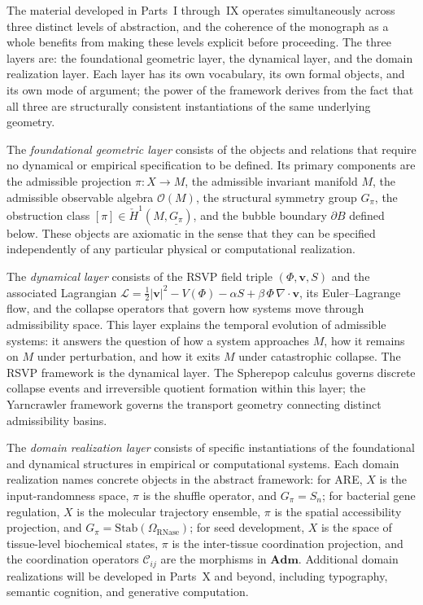 \documentclass[12pt, a4paper]{article}
\theoremstyle{essaystyle}
\begin{document}
The material developed in Parts~I through~IX operates simultaneously across three
distinct levels of abstraction, and the coherence of the monograph as a whole benefits
from making these levels explicit before proceeding. The three layers are: the
foundational geometric layer, the dynamical layer, and the domain realization layer.
Each layer has its own vocabulary, its own formal objects, and its own mode of
argument; the power of the framework derives from the fact that all three are
structurally consistent instantiations of the same underlying geometry.

The \emph{foundational geometric layer} consists of the objects and relations
that require no dynamical or empirical specification to be defined. Its primary
components are the admissible projection $\pi : X \to M$, the admissible invariant
manifold $M$, the admissible observable algebra $\mathcal{O}(M)$, the structural
symmetry group $G_\pi$, the obstruction class $[\pi] \in \check{H}^1(M, \underline{G_\pi})$,
and the bubble boundary $\partial B$ defined below. These objects are axiomatic in the
sense that they can be specified independently of any particular physical or
computational realization.

The \emph{dynamical layer} consists of the RSVP field triple $(\Phi, \mathbf{v}, S)$
and the associated Lagrangian $\mathcal{L} = \tfrac{1}{2}|\mathbf{v}|^2 - V(\Phi) -
\alpha S + \beta\,\Phi\,\nabla\cdot\mathbf{v}$, its Euler--Lagrange flow, and the
collapse operators that govern how systems move through admissibility space.
This layer explains the temporal evolution of admissible systems: it answers the
question of how a system approaches $M$, how it remains on $M$ under perturbation,
and how it exits $M$ under catastrophic collapse. The RSVP framework is the dynamical
layer. The Spherepop calculus governs discrete collapse events and irreversible
quotient formation within this layer; the Yarncrawler framework governs the
transport geometry connecting distinct admissibility basins.

The \emph{domain realization layer} consists of specific instantiations of the
foundational and dynamical structures in empirical or computational systems.
Each domain realization names concrete objects in the abstract framework: for ARE,
$X$ is the input-randomness space, $\pi$ is the shuffle operator, and $G_\pi = S_n$;
for bacterial gene regulation, $X$ is the molecular trajectory ensemble, $\pi$ is the
spatial accessibility projection, and $G_\pi = \mathrm{Stab}(\Omega_{\mathrm{RNase}})$;
for seed development, $X$ is the space of tissue-level biochemical states,
$\pi$ is the inter-tissue coordination projection, and the coordination operators
$\mathcal{C}_{ij}$ are the morphisms in $\mathbf{Adm}$. Additional domain realizations
will be developed in Parts~X and beyond, including typography, semantic cognition,
and generative computation.
\end{document}

